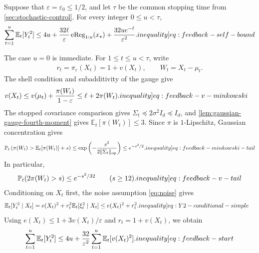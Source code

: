 \documentclass[12pt,cleveref]{jmlr}
\renewenvironment{proof}[1][\proofname]
{\par\noindent{\bfseries\upshape #1\ }}
{\jmlrQED}
\newcommand{\ineqlabel}[1]{\label[inequality]{#1}}
\newcommand{\E}{\mathbb E}
\newcommand{\Pp}{\mathbb P}
\newcommand{\op}{\mathrm{op}}
\newcommand{\1}{\mathbf 1}
\newcommand{\eps}{\varepsilon}
\newcommand{\alireza}[1]{\todo[color=blue!20,size=\tiny]{Alireza: #1}}
\begin{document}
\begin{lemma}
    \label{lem:feedback}
    Suppose that $\eps=\eps_0\leq1/2$, and let $\tau$ be the common
    stopping time from \cref{sec:stochastic-control}. For every integer
    $0\leq u<\tau$,\alireza{needs rewrite.}
    \begin{align}
        \sum_{t=1}^u\E_t[Y_t^2]
        \leq4u+\frac{32\ell}{\eps}\operatorname{eReg}_{1:u}(x_\star)
        +\frac{32ue^{-\ell}}{\eps^2}.
        \ineqlabel{eq:feedback-self-bound}
    \end{align}
\end{lemma}
\begin{proof}
    The case $u=0$ is immediate. For $1\leq t\leq u<\tau$, write
    \begin{align}
        r_t=\pi_\eps(X_t)=1+v(X_t),
        \qquad W_t=X_t-\mu_t.
    \end{align}
    The shell condition and subadditivity of the gauge give
    \begin{align}
        v(X_t)
        & \leq v(\mu_t)+\frac{\pi(W_t)}{1-\eps}
        \leq \ell+2\pi(W_t).
        \ineqlabel{eq:feedback-v-minkowski}
    \end{align}
    The stopped covariance comparison gives
    $\Sigma_t\preceq2\sigma^2I_d\preceq I_d$, and
    \cref{lem:gaussian-gauge-fourth-moment} gives
    $\E_t[\pi(W_t)]\leq3$.
    Since $\pi$ is $1$-Lipschitz, Gaussian concentration gives
    \begin{align}
        \Pp_t\left(\pi(W_t)>\E_t[\pi(W_t)]+s\right)
        \leq\exp\left(-\frac{s^2}{2\|\Sigma_t\|_{\op}}\right)
        \leq e^{-s^2/2}.
        \ineqlabel{eq:feedback-minkowski-tail}
    \end{align}
    In particular,
    \begin{align}
        \Pp_t(2\pi(W_t)>s)\leq e^{-s^2/32}
        \qquad(s\geq12).
        \ineqlabel{eq:feedback-v-tail}
    \end{align}
    Conditioning on $X_t$ first, the noise assumption \cref{eq:noise} gives
    \begin{align}
        \E_t[Y_t^2\mid X_t]
        & =e(X_t)^2+r_t^2\E_t[\xi_t^2\mid X_t]
        \leq e(X_t)^2+r_t^2.
        \ineqlabel{eq:Y2-conditional-simple}
    \end{align}
    Using $e(X_t)\leq1+3v(X_t)/\eps$ and $r_t=1+v(X_t)$, we obtain
    \begin{align}
        \sum_{t=1}^u\E_t[Y_t^2]
        \leq4u+\frac{32}{\eps^2}
        \sum_{t=1}^u\E_t[v(X_t)^2].
        \ineqlabel{eq:feedback-start}
    \end{align}

\end{proof}
\end{document}
